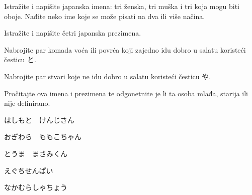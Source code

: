 
\author{Tomislav Mamić, Željka Ludošan}

	
	\begin{mondai}{}
		\item Istražite i napišite japanska imena: tri ženska, tri muška i tri koja mogu biti oboje. Nađite neko ime koje se može pisati na dva ili više načina.
		\item Istražite i napišite četri japanska prezimena.
		\item Nabrojite par komada voća ili povrća koji zajedno idu dobro u salatu koristeći česticu と.
		\item Nabrojite par stvari koje ne idu dobro u salatu koristeći česticu や.
	\end{mondai}
	
	\begin{mondai}{Pročitajte ova imena i prezimena te odgonetnite je li ta osoba mlađa, starija ili nije definirano.}
		\item はしもと　けんじさん
		\item おぎわら　ももこちゃん
		\item とうま　まさみくん
		\item えぐちせんぱい
		\item なかむらしゃちょう
	\end{mondai}

	

